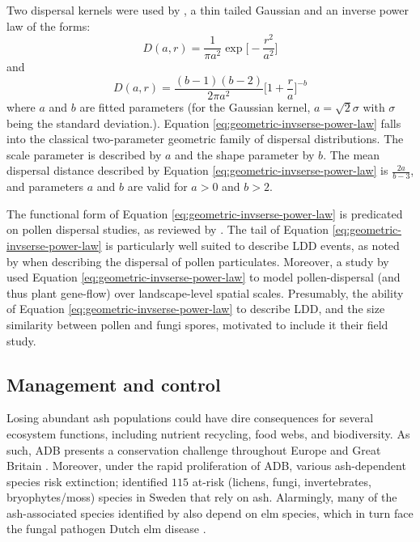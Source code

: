 Two dispersal kernels were used by \cite{grosdidier2018tracking}, a thin tailed Gaussian and an inverse 
power law of the forms:
\begin{equation}
    D(a, r) = \frac{1}{\pi a^2}\exp\big[-\frac{r^2}{a^2}\big]
    \label{eq:adb-ga}
\end{equation}
and
\begin{equation}
    D(a, r) = \frac{(b-1)(b-2)}{2\pi a^2}\big[ 1+ \frac{r}{a}\big]^{-b}
    \label{eq:geometric-invserse-power-law}
\end{equation}
where $a$ and $b$ are fitted parameters (for the Gaussian kernel, $a=\sqrt{2}\sigma$ with $\sigma$ being the standard deviation.). 
Equation \ref{eq:geometric-invserse-power-law} falls into the classical two-parameter geometric family of dispersal distributions.
The scale parameter is described by $a$ and the shape parameter by $b$. The mean dispersal distance described by Equation
\ref{eq:geometric-invserse-power-law} is  $\frac{2a}{b-3}$, and parameters $a$ and $b$ are valid for $a>0$ and $b>2$.

The functional form of Equation \ref{eq:geometric-invserse-power-law} is predicated on pollen dispersal studies,
as reviewed by \cite{nathan2012dispersal}. The tail of Equation \ref{eq:geometric-invserse-power-law} is 
particularly well suited to describe LDD events, as noted by \cite{https://doi.org/10.1111/j.1365-294X.2004.02100.x}
when describing the dispersal of pollen particulates. Moreover, a study by \cite{https://doi.org/10.1111/j.1365-294X.2006.03155.x}
used Equation \ref{eq:geometric-invserse-power-law} to model pollen-dispersal (and thus plant gene-flow) over landscape-level spatial scales. 
Presumably, the ability of Equation \ref{eq:geometric-invserse-power-law} to describe LDD, and the size similarity between pollen and fungi spores, 
motivated \cite{grosdidier2018tracking} to include it their field study. 

\newpage

\subsection{Management and control}

Losing abundant ash populations could have dire consequences for several ecosystem functions, 
including nutrient recycling, food webs, and biodiversity.
As such, ADB presents a conservation challenge throughout Europe and Great Britain \cite{pautasso2013european}.
Moreover, under the rapid proliferation of ADB, various ash-dependent species risk extinction;
\cite{hultberg2020ash} identified $115$ at-risk (lichens, fungi, invertebrates, bryophytes/moss) species in Sweden that rely on ash.
Alarmingly, many of the ash-associated species identified by \cite{hultberg2020ash} also depend on elm species, which in turn face 
the fungal pathogen Dutch elm disease \cite{brasier1991ophiostoma}.

